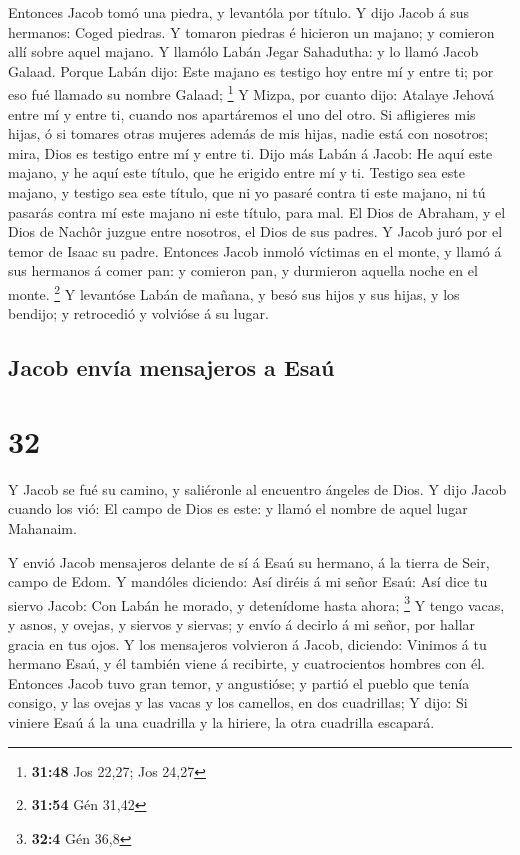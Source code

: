  Entonces Jacob tomó una piedra, y levantóla por título.
 Y dijo Jacob á sus hermanos: Coged piedras. Y tomaron
piedras é hicieron un majano; y comieron allí sobre aquel majano.
 Y llamólo Labán Jegar Sahadutha: y lo llamó Jacob
Galaad.  Porque Labán dijo: Este majano es testigo hoy
entre mí y entre ti; por eso fué llamado su nombre Galaad; \footnote{\textbf{31:48}
  Jos 22,27; Jos 24,27}  Y Mizpa, por cuanto dijo:
Atalaye Jehová entre mí y entre ti, cuando nos apartáremos el uno del
otro.  Si afligieres mis hijas, ó si tomares otras
mujeres además de mis hijas, nadie está con nosotros; mira, Dios es
testigo entre mí y entre ti.  Dijo más Labán á Jacob: He
aquí este majano, y he aquí este título, que he erigido entre mí y ti.
 Testigo sea este majano, y testigo sea este título, que
ni yo pasaré contra ti este majano, ni tú pasarás contra mí este majano
ni este título, para mal.  El Dios de Abraham, y el Dios
de Nachôr juzgue entre nosotros, el Dios de sus padres. Y Jacob juró por
el temor de Isaac su padre.  Entonces Jacob inmoló
víctimas en el monte, y llamó á sus hermanos á comer pan: y comieron
pan, y durmieron aquella noche en el monte. \footnote{\textbf{31:54} Gén
  31,42}  Y levantóse Labán de mañana, y besó sus hijos y
sus hijas, y los bendijo; y retrocedió y volvióse á su lugar.

\hypertarget{jacob-envuxeda-mensajeros-a-esauxfa}{%
\subsection{Jacob envía mensajeros a
Esaú}\label{jacob-envuxeda-mensajeros-a-esauxfa}}

\hypertarget{section-31}{%
\section{32}\label{section-31}}

 Y Jacob se fué su camino, y saliéronle al encuentro
ángeles de Dios.  Y dijo Jacob cuando los vió: El campo de
Dios es este: y llamó el nombre de aquel lugar Mahanaim.

 Y envió Jacob mensajeros delante de sí á Esaú su hermano,
á la tierra de Seir, campo de Edom.  Y mandóles diciendo:
Así diréis á mi señor Esaú: Así dice tu siervo Jacob: Con Labán he
morado, y detenídome hasta ahora; \footnote{\textbf{32:4} Gén 36,8}
 Y tengo vacas, y asnos, y ovejas, y siervos y siervas; y
envío á decirlo á mi señor, por hallar gracia en tus ojos.
 Y los mensajeros volvieron á Jacob, diciendo: Vinimos á
tu hermano Esaú, y él también viene á recibirte, y cuatrocientos hombres
con él.  Entonces Jacob tuvo gran temor, y angustióse; y
partió el pueblo que tenía consigo, y las ovejas y las vacas y los
camellos, en dos cuadrillas;  Y dijo: Si viniere Esaú á la
una cuadrilla y la hiriere, la otra cuadrilla escapará.


